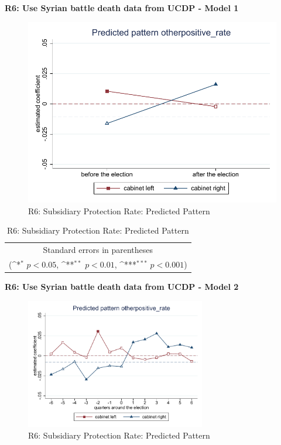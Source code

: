 \documentclass[10pt,a4paper]{scrartcl}
\begin{document}
\clearpage
\textbf{R6: Use Syrian battle death data from UCDP - Model 1}
\begin{figure}[!ht]
	\centering
	\includegraphics[width=1\textwidth]{figures_edited/otherpositive_rate_graph1_R6.pdf}
	\caption{R6: Subsidiary Protection Rate: Predicted Pattern}
\end{figure}

\begin{table}[!ht]\centering
	\renewcommand{\arraystretch}{1.25}
	\def\sym#1{\ifmmode^{#1}\else\(^{#1}\)\fi}
	\caption{R6: Subsidiary Protection Rate: Predicted Pattern}
	\begin{tabular}{l*{2}{c}}
		\hline\hline
		
		\hline\hline
		\multicolumn{3}{c}{\footnotesize Standard errors in parentheses} \\
		\multicolumn{3}{c}{\footnotesize (\sym{*} \(p<0.05\), \sym{**} \(p<0.01\), \sym{***} \(p<0.001\))}\\
	\end{tabular}
\end{table}

\clearpage
\textbf{R6: Use Syrian battle death data from UCDP - Model 2}
\begin{figure}[!ht]
	\centering
	\includegraphics[width=0.7\textwidth]{figures_edited/otherpositive_rate_graph2_R6.pdf}
	\caption{R6: Subsidiary Protection Rate: Predicted Pattern}
\end{figure}
\end{document}
